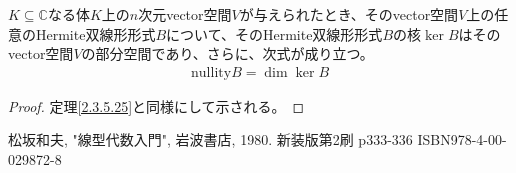 \documentclass[dvipdfmx]{jsarticle}
\begin{document}
\begin{thm}\label{2.3.5.26}
$K \subseteq \mathbb{C}$なる体$K$上の$n$次元vector空間$V$が与えられたとき、そのvector空間$V$上の任意のHermite双線形形式$B$について、そのHermite双線形形式$B$の核$\ker B$はそのvector空間$V$の部分空間であり、さらに、次式が成り立つ。
\begin{align*}
{\mathrm{nullity}}B = \dim{\ker B}
\end{align*}
\end{thm}
\begin{proof} 定理\ref{2.3.5.25}と同様にして示される。
\end{proof}
\begin{thebibliography}{50}
  松坂和夫, "線型代数入門", 岩波書店, 1980. 新装版第2刷 p333-336 ISBN978-4-00-029872-8
\end{thebibliography}
\end{document}

